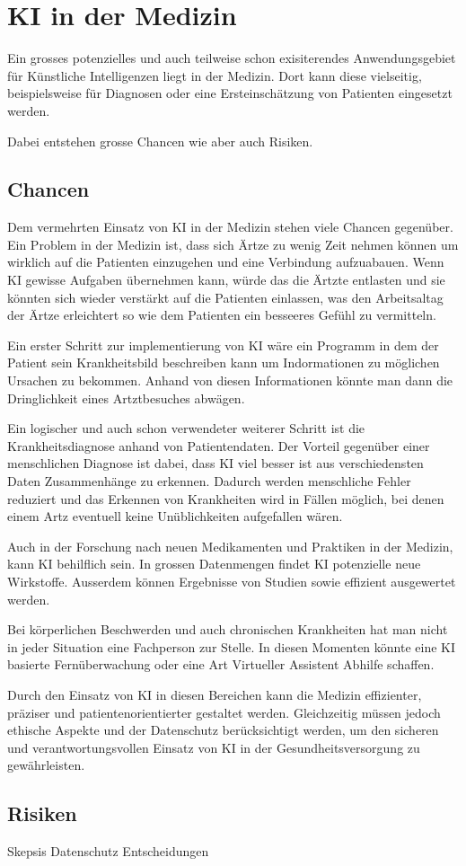 \chapter{KI in der Medizin}
\label{chap:ai-medicine}

Ein grosses potenzielles und auch teilweise schon exisiterendes Anwendungsgebiet für Künstliche Intelligenzen liegt in der Medizin.
Dort kann diese vielseitig, beispielsweise für Diagnosen oder eine Ersteinschätzung von Patienten eingesetzt werden.

Dabei entstehen grosse Chancen wie aber auch Risiken.

\section{Chancen}
Dem vermehrten Einsatz von KI in der Medizin stehen viele Chancen gegenüber.
Ein Problem in der Medizin ist, dass sich Ärtze zu wenig Zeit nehmen können um wirklich auf die Patienten einzugehen und eine Verbindung aufzuabauen.
Wenn KI gewisse Aufgaben übernehmen kann, würde das die Ärtzte entlasten und sie könnten sich wieder verstärkt auf die Patienten einlassen, was den Arbeitsaltag der Ärtze erleichtert so wie dem Patienten ein besseeres Gefühl zu vermitteln.

Ein erster Schritt zur implementierung von KI wäre ein Programm in dem der Patient sein Krankheitsbild beschreiben kann um Indormationen zu möglichen Ursachen zu bekommen. Anhand von diesen Informationen könnte man dann die Dringlichkeit eines Artztbesuches abwägen.

Ein logischer und auch schon verwendeter weiterer Schritt ist die Krankheitsdiagnose anhand von Patientendaten. 
Der Vorteil gegenüber einer menschlichen Diagnose ist dabei, dass KI viel besser ist aus verschiedensten Daten Zusammenhänge zu erkennen. 
Dadurch werden menschliche Fehler reduziert und das Erkennen von Krankheiten wird in Fällen möglich, bei denen einem Artz eventuell keine Unüblichkeiten aufgefallen wären.

Auch in der Forschung nach neuen Medikamenten und Praktiken in der Medizin, kann KI behilflich sein. In grossen Datenmengen findet KI potenzielle neue Wirkstoffe.
Ausserdem können Ergebnisse von Studien sowie effizient ausgewertet werden.

Bei körperlichen Beschwerden und auch chronischen Krankheiten hat man nicht in jeder Situation eine Fachperson zur Stelle. In diesen Momenten könnte eine KI basierte Fernüberwachung oder eine Art Virtueller Assistent Abhilfe schaffen.

\vspace{3mm} \noindent
Durch den Einsatz von KI in diesen Bereichen kann die Medizin effizienter, präziser und patientenorientierter gestaltet werden. 
Gleichzeitig müssen jedoch ethische Aspekte und der Datenschutz berücksichtigt werden, um den sicheren und verantwortungsvollen Einsatz von KI in der Gesundheitsversorgung zu gewährleisten.

\section{Risiken}
Skepsis
Datenschutz
Entscheidungen
